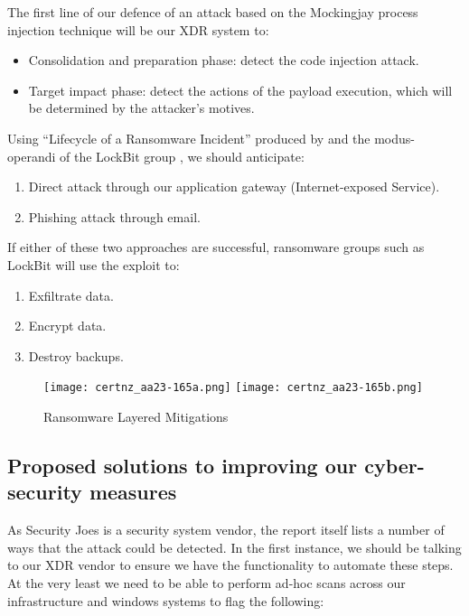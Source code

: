 The first line of our defence of an attack based on the Mockingjay process injection technique will be our XDR system to:
\begin{itemize}
\item Consolidation and preparation phase: detect the code injection attack.
\item Target impact phase: detect the actions of the payload execution, which will be determined by the attacker's motives.
\end{itemize}

Using ``Lifecycle of a Ransomware Incident'' produced by \autocite{Certnz:2021} and the modus-operandi of the LockBit
group \autocite{CISA:2023}, we should anticipate:

\begin{enumerate}
\item Direct attack through our application gateway (Internet-exposed Service).
\item Phishing attack through email.
\end{enumerate}

If either of these two approaches are successful, ransomware groups such as LockBit will use the exploit to:

\begin{enumerate}
\item Exfiltrate data.
\item Encrypt data.
\item Destroy backups.
\end{enumerate}


\begin{figure}[ht]
\texttt{[image: certnz\_aa23-165a.png]}
\texttt{[image: certnz\_aa23-165b.png]}
\caption{Ransomware Layered Mitigations \autocite{Certnz:2021}}
\end{figure}

\pagebreak

\subsection{Proposed solutions to improving our cyber-security measures}

As Security Joes is a security system vendor, the report itself lists a number of ways that the attack could be detected. In
the first instance, we should be talking to our XDR vendor to ensure we have the functionality to automate these steps.  At
the very least we need to be able to perform ad-hoc scans across our infrastructure and windows systems to flag the following:

